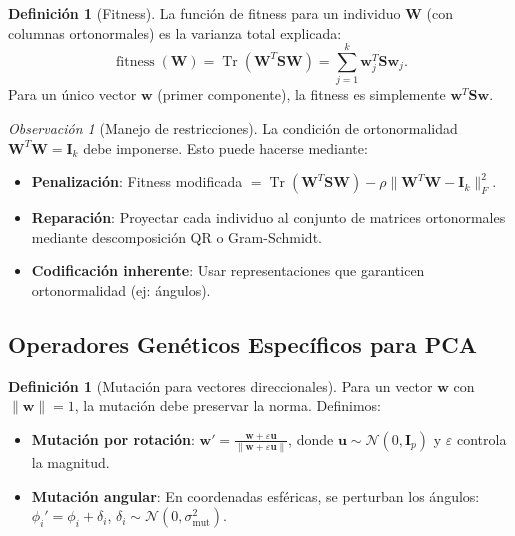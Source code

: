 \documentclass[11pt,a4paper]{article}
\theoremstyle{plain}
\theoremstyle{definition}
\newtheorem{definition}[theorem]{Definición}
\theoremstyle{remark}
\newtheorem{remark}[theorem]{Observación}
\newcommand{\1}{\mathbf{1}}
\begin{document}
\begin{definition}[Fitness]
La función de fitness para un individuo $\mathbf{W}$ (con columnas ortonormales) es la varianza total explicada:
\[
\operatorname{fitness}(\mathbf{W}) = \operatorname{Tr}(\mathbf{W}^T \mathbf{S} \mathbf{W}) = \sum_{j=1}^k \mathbf{w}_j^T \mathbf{S} \mathbf{w}_j.
\]
Para un único vector $\mathbf{w}$ (primer componente), la fitness es simplemente $\mathbf{w}^T \mathbf{S} \mathbf{w}$.
\end{definition}

\begin{remark}[Manejo de restricciones]
La condición de ortonormalidad $\mathbf{W}^T\mathbf{W}=\mathbf{I}_k$ debe imponerse. Esto puede hacerse mediante:
\begin{itemize}
\item \textbf{Penalización}: Fitness modificada $= \operatorname{Tr}(\mathbf{W}^T \mathbf{S} \mathbf{W}) - \rho \|\mathbf{W}^T\mathbf{W} - \mathbf{I}_k\|_F^2$.
\item \textbf{Reparación}: Proyectar cada individuo al conjunto de matrices ortonormales mediante descomposición QR o Gram-Schmidt.
\item \textbf{Codificación inherente}: Usar representaciones que garanticen ortonormalidad (ej: ángulos).
\end{itemize}
\end{remark}

\subsection{Operadores Genéticos Específicos para PCA}

\begin{definition}[Mutación para vectores direccionales]
Para un vector $\mathbf{w}$ con $\|\mathbf{w}\|=1$, la mutación debe preservar la norma. Definimos:
\begin{itemize}
\item \textbf{Mutación por rotación}: $\mathbf{w}' = \frac{\mathbf{w} + \varepsilon \mathbf{u}}{\|\mathbf{w} + \varepsilon \mathbf{u}\|}$, donde $\mathbf{u} \sim \mathcal{N}(0,\mathbf{I}_p)$ y $\varepsilon$ controla la magnitud.
\item \textbf{Mutación angular}: En coordenadas esféricas, se perturban los ángulos: $\phi_i' = \phi_i + \delta_i$, $\delta_i \sim \mathcal{N}(0,\sigma_{\text{mut}}^2)$.
\end{itemize}
\end{definition}
\end{document}
